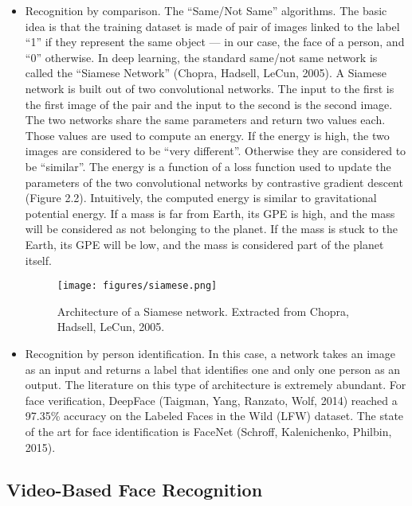 \begin{itemize}
\item Recognition by comparison. The \enquote{Same/Not Same} algorithms. The basic idea is that the training dataset is made of pair of images linked to the label \enquote{1} if they represent the same object --- in our case, the face of a person, and \enquote{0} otherwise. In deep learning, the standard same/not same network is called the \enquote{Siamese Network} (Chopra, Hadsell, LeCun, 2005). A Siamese network is built out of two convolutional networks. The input to the first is the first image of the pair and the input to the second is the second image. The two networks share the same parameters and return two values each. Those values are used to compute an energy. If the energy is high, the two images are considered to be \enquote{very different}. Otherwise they are considered to be \enquote{similar}. The energy is a function of a loss function used to update the parameters of the two convolutional networks by contrastive gradient descent (Figure 2.2). Intuitively, the computed energy is similar to gravitational potential energy. If a mass is far from Earth, its GPE is high, and the mass will be considered as not belonging to the planet. If the mass is stuck to the Earth, its GPE will be low, and the mass is considered part of the planet itself.


\begin{figure}[!ht]
  \centering
  \texttt{[image: figures/siamese.png]}  
  \caption[Architecture of a Siamese network. Extracted from Chopra, Hadsell, LeCun, 2005.]{Architecture of a Siamese network. Extracted from Chopra, Hadsell, LeCun, 2005.}
  \protect\label{fig:Siamese}
\end{figure}

\item Recognition by person identification. In this case, a network takes an image as an input and returns a label that identifies one and only one person as an output. The literature on this type of architecture is extremely abundant. For face verification, DeepFace (Taigman, Yang, Ranzato, Wolf, 2014) reached a 97.35\% accuracy on the Labeled Faces in the Wild (LFW) dataset. The state of the art for face identification is FaceNet (Schroff, Kalenichenko, Philbin, 2015).

\end{itemize}


\subsection{Video-Based Face Recognition}

